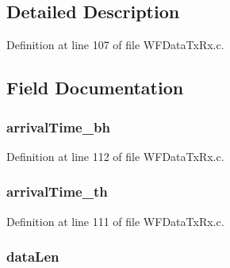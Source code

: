 \subsection{Detailed Description}


Definition at line 107 of file W\+F\+Data\+Tx\+Rx.\+c.



\subsection{Field Documentation}
\hypertarget{structt_w_f_rx_data_indicate_a50819b6bf8ebd6cb15e7a3958da755b6}{}
\subsubsection[{arrival\+Time\+\_\+bh}]{ arrival\+Time\+\_\+bh}\label{structt_w_f_rx_data_indicate_a50819b6bf8ebd6cb15e7a3958da755b6}


Definition at line 112 of file W\+F\+Data\+Tx\+Rx.\+c.

\hypertarget{structt_w_f_rx_data_indicate_a360dd66b759d42b3fb9203f6d6c1bf5a}{}
\subsubsection[{arrival\+Time\+\_\+th}]{ arrival\+Time\+\_\+th}\label{structt_w_f_rx_data_indicate_a360dd66b759d42b3fb9203f6d6c1bf5a}


Definition at line 111 of file W\+F\+Data\+Tx\+Rx.\+c.

\hypertarget{structt_w_f_rx_data_indicate_ac4dc0b4aa8bdda79343e9cf4287adbf6}{}
\subsubsection[{data\+Len}]{ data\+Len}\label{structt_w_f_rx_data_indicate_ac4dc0b4aa8bdda79343e9cf4287adbf6}



